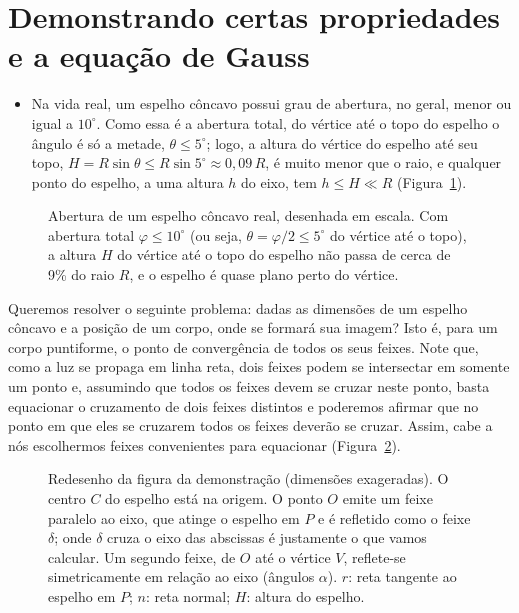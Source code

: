 \documentclass[11pt,a4paper]{article}
\begin{document}
\FloatBarrier
\section*{Demonstrando certas propriedades e a equação de Gauss}

\begin{itemize}[label=$\ast$,leftmargin=17pt,labelsep=6pt,topsep=4pt]
  \item Na vida real, um espelho côncavo possui grau de abertura, no geral,
    menor ou igual a $10^\circ$. Como essa é a abertura total, do vértice até o
    topo do espelho o ângulo é só a metade, $\theta \le 5^\circ$; logo, a altura do
    vértice do espelho até seu topo, $H = R\sin\theta \le R\sin 5^\circ \approx
    0{,}09\,R$, é muito menor que o raio, e qualquer ponto do espelho, a uma
    altura $h$ do eixo, tem $h \le H \ll R$ (Figura~\ref{fig:abertura}).
\end{itemize}

\begin{figure}[H]
  \centering
  \begin{minipage}[c]{0.58\textwidth}
    \centering
    
  \end{minipage}\hfill
  \begin{minipage}[c]{0.38\textwidth}
    \captionsetup{margin=0pt}
    \caption{Abertura de um espelho côncavo real, desenhada em escala. Com
    abertura total $\varphi \le 10^\circ$ (ou seja, $\theta = \varphi/2 \le 5^\circ$
    do vértice até o topo), a altura $H$ do vértice até o topo do espelho não
    passa de cerca de 9\% do raio $R$, e o espelho é quase plano perto do
    vértice.}
    \label{fig:abertura}
  \end{minipage}
\end{figure}

Queremos resolver o seguinte problema: dadas as dimensões de um espelho côncavo
e a posição de um corpo, onde se formará sua imagem? Isto é, para um corpo
puntiforme, o ponto de convergência de todos os seus feixes. Note que, como a
luz se propaga em linha reta, dois feixes podem se intersectar em somente um
ponto e, assumindo que todos os feixes devem se cruzar neste ponto, basta
equacionar o cruzamento de dois feixes distintos e poderemos afirmar que no
ponto em que eles se cruzarem todos os feixes deverão se cruzar. Assim, cabe a
nós escolhermos feixes convenientes para equacionar
(Figura~\ref{fig:demonstracao}).

\begin{figure}[!ht]
  \centering
  
  \caption{Redesenho da figura da demonstração (dimensões exageradas). O centro
    $C$ do espelho está na origem. O ponto $O$ emite um feixe paralelo ao eixo,
    que atinge o espelho em $P$ e é refletido como o feixe $\delta$; onde
    $\delta$ cruza o eixo das abscissas é justamente o que vamos calcular. Um
    segundo feixe, de $O$ até o vértice $V$, reflete-se simetricamente em relação
    ao eixo (ângulos $\alpha$). $r$: reta tangente ao espelho em $P$; $n$: reta
    normal; $H$: altura do espelho.}
  \label{fig:demonstracao}
\end{figure}
\end{document}
